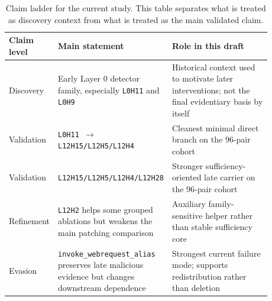 \documentclass{article}
\begin{document}
\begin{table}[t]
\centering
\caption{Claim ladder for the current study. This table separates what is treated as discovery context from what is treated as the main validated claim.}
\label{tab:claim-ladder}
\begin{tabular}{p{0.18\linewidth} p{0.28\linewidth} p{0.42\linewidth}}
\toprule
Claim level & Main statement & Role in this draft \\
\midrule
Discovery & Early Layer 0 detector family, especially \texttt{L0H11} and \texttt{L0H9} & Historical context used to motivate later interventions; not the final evidentiary basis by itself \\
Validation & \texttt{L0H11 $\rightarrow$ L12H15/L12H5/L12H4} & Cleanest minimal direct branch on the 96-pair cohort \\
Validation & \texttt{L12H15/L12H5/L12H4/L12H28} & Stronger sufficiency-oriented late carrier on the 96-pair cohort \\
Refinement & \texttt{L12H2} helps some grouped ablations but weakens the main patching comparison & Auxiliary family-sensitive helper rather than stable sufficiency core \\
Evasion & \texttt{invoke\_webrequest\_alias} preserves late malicious evidence but changes downstream dependence & Strongest current failure mode; supports redistribution rather than deletion \\
\bottomrule
\end{tabular}
\end{table}
\end{document}
